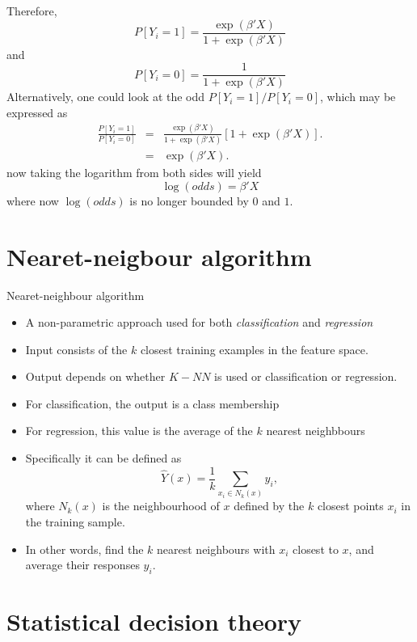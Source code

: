 \documentclass{beamer}
\begin{document}
\begin{frame}
Therefore,
\[
P[Y_i=1]=\frac{\exp(\beta'X)}{1+\exp(\beta'X)}
\]
and
\[
P[Y_i=0]=\frac{1}{1+\exp(\beta'X)}
\]
Alternatively, one could look at the odd $P[Y_i=1]/P[Y_i=0]$, which may be expressed as
\begin{eqnarray*}
\frac{P[Y_i=1]}{P[Y_i=0]}&=&\frac{\exp(\beta'X)}{1+\exp(\beta'X)}[1+\exp(\beta'X)].\\
&=&\exp(\beta'X).
\end{eqnarray*}
now taking the logarithm from both sides will yield
\begin{equation}
\log(odds)=\beta'X
\end{equation}
where now $\log(odds)$ is no longer bounded by $0$ and $1$.
\end{frame}
\section{Nearet-neigbour algorithm}
\begin{frame}{Nearet-neighbour algorithm}
\begin{itemize}
\item{} A non-parametric approach used for both \textit{classification} and \textit{regression}
\item{} Input consists of the $k$ closest training examples in the feature space.
\item{} Output depends on whether $K-NN$ is used or classification or regression.
\item{} For classification, the output is a class membership
\item{} For regression, this value is the average of the $k$ nearest neighbbours
\item{} Specifically it can be defined as
\begin{equation}
\hat{Y}(x)=\frac{1}{k}\sum\limits_{x_i\in N_k(x)}y_i,
\end{equation}
where $N_k(x)$ is the neighbourhood of $x$ defined by the $k$ closest points $x_i$ in the training sample.
\item{} In other words, find the $k$ nearest neighbours with $x_i$ closest to $x$, and average their responses $y_i$.
\end{itemize}
\end{frame}
\section{Statistical decision theory}
\end{document}
